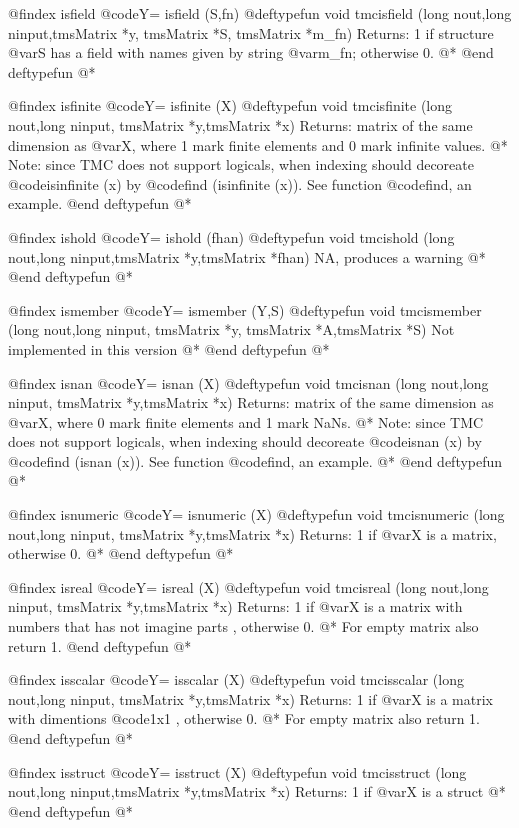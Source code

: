 @findex  isfield
@code{Y= isfield (S,fn) }
@deftypefun void tmcisfield (long nout,long ninput,tmsMatrix *y, tmsMatrix *S, tmsMatrix *m_fn)
Returns: 1 if structure @var{S} has a field with names given by string @var{m_fn}; otherwise 0. @*
@end deftypefun
@*

@findex  isfinite
@code{Y= isfinite (X) }
@deftypefun void tmcisfinite (long nout,long ninput, tmsMatrix *y,tmsMatrix *x)
Returns: matrix of the same dimension as @var{X}, where 1 mark finite elements and 0 mark infinite values. @*
Note: since TMC does not support logicals, when indexing should decoreate @code{isinfinite (x)} by @code{find (isinfinite (x))}. See function @code{find}, an example.
@end deftypefun
@*

@findex  ishold
@code{Y= ishold (fhan) }
@deftypefun void tmcishold  (long nout,long ninput,tmsMatrix *y,tmsMatrix *fhan)
NA, produces a warning @*
@end deftypefun
@*

@findex  ismember  
@code{Y= ismember (Y,S) }
@deftypefun void tmcismember  (long nout,long ninput, tmsMatrix *y, tmsMatrix *A,tmsMatrix *S)
Not implemented in this version @*
@end deftypefun
@*

@findex  isnan
@code{Y= isnan (X) }
@deftypefun void tmcisnan  (long nout,long ninput, tmsMatrix *y,tmsMatrix *x)
Returns: matrix of the same dimension as @var{X}, where 0 mark finite elements and 1 mark NaNs. @*
Note: since TMC does not support logicals, when indexing should decoreate @code{isnan (x)} by @code{find (isnan (x))}. See function @code{find}, an example. @*
@end deftypefun
@*

@findex  isnumeric
@code{Y= isnumeric (X) }
@deftypefun void tmcisnumeric  (long nout,long ninput, tmsMatrix *y,tmsMatrix *x)
Returns: 1 if  @var{X} is a   matrix, otherwise 0. @*
@end deftypefun
@*

@findex  isreal
@code{Y= isreal (X) }
@deftypefun void tmcisreal  (long nout,long ninput, tmsMatrix *y,tmsMatrix *x)
Returns: 1 if  @var{X} is  a  matrix with numbers that has not imagine parts , otherwise 0. @*
For empty matrix also return 1.
@end deftypefun
@*

@findex  isscalar
@code{Y= isscalar (X) }
@deftypefun void tmcisscalar  (long nout,long ninput, tmsMatrix *y,tmsMatrix *x)
Returns: 1 if  @var{X} is  a matrix with dimentions @code{1x1} , otherwise 0. @*
For empty matrix also return 1.
@end deftypefun
@*

@findex  isstruct
@code{Y= isstruct (X) }
@deftypefun void tmcisstruct  (long nout,long ninput,tmsMatrix *y,tmsMatrix *x)
Returns: 1 if  @var{X} is  a struct @*
@end deftypefun
@*



